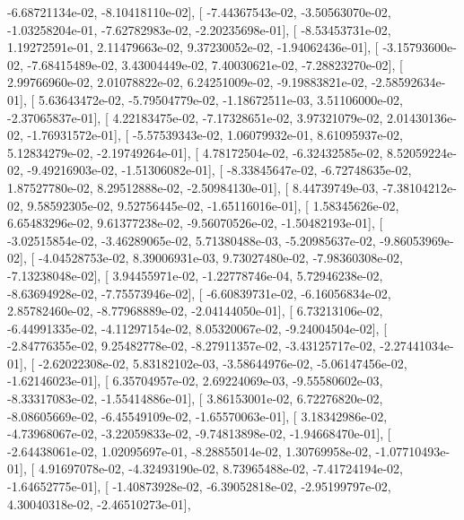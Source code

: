 \documentclass{article}
\begin{document}
         -6.68721134e-02,  -8.10418110e-02],
       [ -7.44367543e-02,  -3.50563070e-02,  -1.03258204e-01,
         -7.62782983e-02,  -2.20235698e-01],
       [ -8.53453731e-02,   1.19272591e-01,   2.11479663e-02,
          9.37230052e-02,  -1.94062436e-01],
       [ -3.15793600e-02,  -7.68415489e-02,   3.43004449e-02,
          7.40030621e-02,  -7.28823270e-02],
       [  2.99766960e-02,   2.01078822e-02,   6.24251009e-02,
         -9.19883821e-02,  -2.58592634e-01],
       [  5.63643472e-02,  -5.79504779e-02,  -1.18672511e-03,
          3.51106000e-02,  -2.37065837e-01],
       [  4.22183475e-02,  -7.17328651e-02,   3.97321079e-02,
          2.01430136e-02,  -1.76931572e-01],
       [ -5.57539343e-02,   1.06079932e-01,   8.61095937e-02,
          5.12834279e-02,  -2.19749264e-01],
       [  4.78172504e-02,  -6.32432585e-02,   8.52059224e-02,
         -9.49216903e-02,  -1.51306082e-01],
       [ -8.33845647e-02,  -6.72748635e-02,   1.87527780e-02,
          8.29512888e-02,  -2.50984130e-01],
       [  8.44739749e-03,  -7.38104212e-02,   9.58592305e-02,
          9.52756445e-02,  -1.65116016e-01],
       [  1.58345626e-02,   6.65483296e-02,   9.61377238e-02,
         -9.56070526e-02,  -1.50482193e-01],
       [ -3.02515854e-02,  -3.46289065e-02,   5.71380488e-03,
         -5.20985637e-02,  -9.86053969e-02],
       [ -4.04528753e-02,   8.39006931e-03,   9.73027480e-02,
         -7.98360308e-02,  -7.13238048e-02],
       [  3.94455971e-02,  -1.22778746e-04,   5.72946238e-02,
         -8.63694928e-02,  -7.75573946e-02],
       [ -6.60839731e-02,  -6.16056834e-02,   2.85782460e-02,
         -8.77968889e-02,  -2.04144050e-01],
       [  6.73213106e-02,  -6.44991335e-02,  -4.11297154e-02,
          8.05320067e-02,  -9.24004504e-02],
       [ -2.84776355e-02,   9.25482778e-02,  -8.27911357e-02,
         -3.43125717e-02,  -2.27441034e-01],
       [ -2.62022308e-02,   5.83182102e-03,  -3.58644976e-02,
         -5.06147456e-02,  -1.62146023e-01],
       [  6.35704957e-02,   2.69224069e-03,  -9.55580602e-03,
         -8.33317083e-02,  -1.55414886e-01],
       [  3.86153001e-02,   6.72276820e-02,  -8.08605669e-02,
         -6.45549109e-02,  -1.65570063e-01],
       [  3.18342986e-02,  -4.73968067e-02,  -3.22059833e-02,
         -9.74813898e-02,  -1.94668470e-01],
       [ -2.64438061e-02,   1.02095697e-01,  -8.28855014e-02,
          1.30769958e-02,  -1.07710493e-01],
       [  4.91697078e-02,  -4.32493190e-02,   8.73965488e-02,
         -7.41724194e-02,  -1.64652775e-01],
       [ -1.40873928e-02,  -6.39052818e-02,  -2.95199797e-02,
          4.30040318e-02,  -2.46510273e-01],
\end{document}
